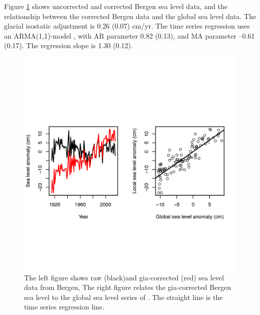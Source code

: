 \documentclass[draft,linenumbers]{agujournal}
\begin{document}
Figure \ref{fig:bergenobs} shows uncorrected and corrected Bergen sea level data, and the relationship between the corrected Bergen data and the global sea level data. The glacial isostatic adjustment is 0.26 (0.07) cm/yr. The time series regression uses an ARMA(1,1)-model \citep{boxjenkins}, with AR parameter 0.82 (0.13), and MA parameter --0.61 (0.17). The regression slope is 1.30 (0.12).
\begin{figure}[!hbpt]
\begin{center}
\includegraphics[width=\linewidth]{bergenfit.png}
\caption{ The left figure shows raw (black)and gia-corrected (red) sea level data from Bergen, The right figure relates the gia-corrected Bergen sea level to the global sea level series of \citet{csiro}. The straight line is the time series regression line.}
\label{fig:bergenobs}
\end{center}
\end{figure}
\end{document}
